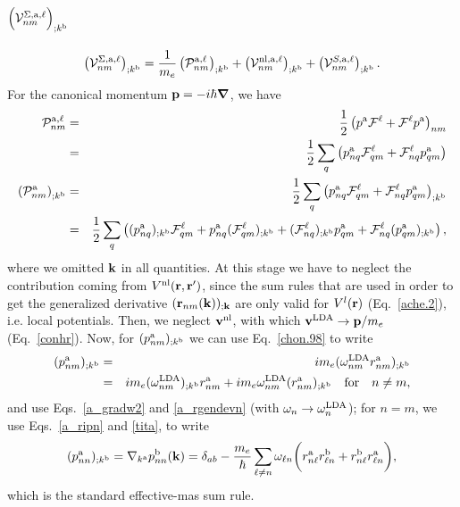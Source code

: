 \documentclass[floatfix,prb,aps,superscriptaddress,11pt,preprint]{revtex4}
\begin{document}
\section{$\Big({\cal V}^{\Sigma,\mathrm{a},\ell}_{nm}\Big)_{;k^{\mathrm{b}}}$}\label{calvs}
\begin{eqnarray}\label{a.1}
\left(
{\mathbf{\cal V}}^{\Sigma,\mathrm{a},\ell}_{nm}
\right)_{;k^{\mathrm{b}}}
=
\frac{1}{m_e}
\left(
{\mathbf{\cal P}}^{\mathrm{a},\ell}_{nm}
\right)_{;k^{\mathrm{b}}}
+
\left(
{\mathbf{\cal V}}^{\mathrm{nl},\mathrm{a},\ell}_{nm}
\right)_{;k^{\mathrm{b}}}
+
\left(
{\mathbf{\cal V}}^{S,\mathrm{a},\ell}_{nm}
\right)_{;k^{\mathrm{b}}}
.
\end{eqnarray}
For the canonical momentum $\mathbf{p}=-i\hbar\boldsymbol{\nabla}$, we have
\begin{eqnarray}\label{a.2}
{\mathbf{\cal P}}^{\mathrm{a},\ell}_{nm}
&=&
\frac{1}{2}\left(
p^{\mathrm{a}}{\mathbf{\cal F}}^\ell+{\mathbf{\cal F}}^\ell p^{\mathrm{a}}
\right)_{nm}
\nonumber\\
&=&
\frac{1}{2}\sum_q\left(
p^{\mathrm{a}}_{nq}{\mathbf{\cal F}}^\ell_{qm}+{\mathbf{\cal F}}^\ell_{nq} p_{qm}^{\mathrm{a}}
\right)
\nonumber\\
\left({\mathbf{\cal P}}^{\mathrm{a}}_{nm}\right)_{;k^{\mathrm{b}}}
&=&
\frac{1}{2}\sum_q\left(
p^{\mathrm{a}}_{nq}{\mathbf{\cal F}}^\ell_{qm}+{\mathbf{\cal F}}^\ell_{nq} p_{qm}^{\mathrm{a}}
\right) _{;k^{\mathrm{b}}}
\nonumber\\
&=&
\frac{1}{2}\sum_q\left(
(p^{\mathrm{a}}_{nq})_{;k^{\mathrm{b}}}{\mathbf{\cal F}}^\ell_{qm}
+ 
p^{\mathrm{a}}_{nq}({\mathbf{\cal F}}^\ell_{qm})_{;k^{\mathrm{b}}}
+
({\mathbf{\cal F}}^\ell_{nq})_{;k^{\mathrm{b}}} p_{qm}^{\mathrm{a}}
+
{\mathbf{\cal F}}^\ell_{nq} (p_{qm}^{\mathrm{a}})_{;k^{\mathrm{b}}}
\right)
,
\end{eqnarray} 
where we omitted $\mathbf{k}$ in all quantities.
At this stage we have to neglect the contribution coming from
$V^{\mathrm{nl}}(\mathbf{r},\mathbf{r}')$, since the sum rules that are used in order to get
the generalized derivative $(\mathbf{r}_{nm}(\mathbf{k}))_{;\mathbf{k}}$ are only valid
for $V^l(\mathbf{r})$ (Eq.~\eqref{ache.2}), i.e. local potentials.\cite{nastosPRB05}
Then, we neglect $\mathbf{v}^{\mathrm{nl}}$, with which $\mathbf{v}^{\mathrm{LDA}}\to\mathbf{p}/m_e$ (Eq.~\eqref{conhr}).
Now, for $(p^{\mathrm{a}}_{nm})_{;k^{\mathrm{b}}}$
we can use
Eq.~\eqref{chon.98} to write
\begin{eqnarray}\label{a.3}
(p^{\mathrm{a}}_{nm})_{;k^{\mathrm{b}}}
&=& 
im_e(\omega^{\mathrm{LDA}}_{nm}r^{\mathrm{a}}_{nm})_{;k^{\mathrm{b}}}
\nonumber\\
&=& 
im_e(\omega^{\mathrm{LDA}}_{nm})_{;k^{\mathrm{b}}} r^{\mathrm{a}}_{nm}
+ 
im_e\omega^{\mathrm{LDA}}_{nm}(r^{\mathrm{a}}_{nm})_{;k^{\mathrm{b}}}
\quad\mathrm{for}\quad n\ne m
,
\end{eqnarray} 
and use Eqs.~\eqref{a_gradw2} and \eqref{a_rgendevn} (with
$\omega_n\to\omega_n^{\mathrm{LDA}}$); for $n=m$, we use Eqs.~\eqref{a_ripn} and \eqref{tita}, to write
\begin{eqnarray}\label{a.3c}
(p^{\mathrm{a}}_{nn})_{;k^{\mathrm{b}}}
=
\nabla_{k^{\mathrm{a}}}
p^{\mathrm{b}}_{nn}(\mathbf{k})
=
\delta_{ab}
-\frac{m_e}{\hbar}
\sum_{\ell\ne n}
\omega_{\ell n}
\bigg(
r^{\mathrm{a}}_{n\ell}
r^{\mathrm{b}}_{\ell n}
+
r^{\mathrm{b}}_{n\ell}
r^{\mathrm{a}}_{\ell n}
\bigg)
,
\end{eqnarray}
which is the standard effective-mas sum rule.\cite{nastosPRB05}
\end{document}
